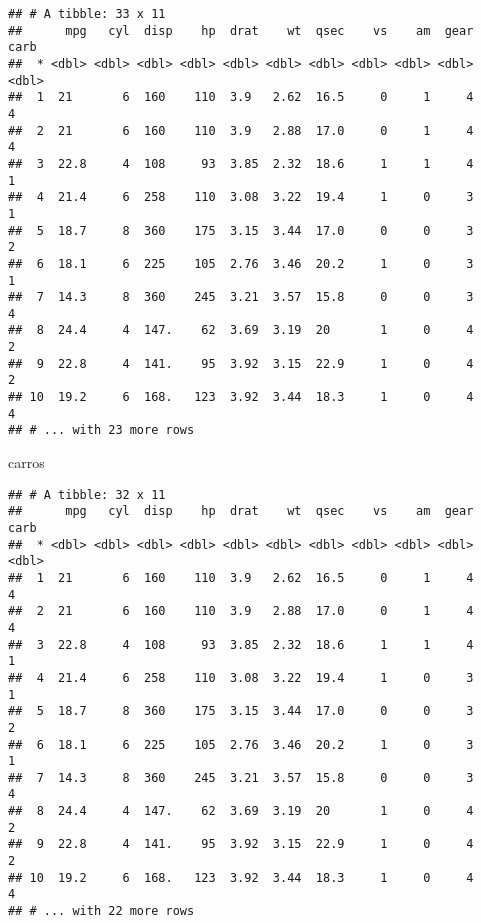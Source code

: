 \documentclass[]{book}
\newenvironment{Shaded}{\begin{snugshade}}{\end{snugshade}}
\newcommand{\DataTypeTok}[1]{\textcolor[rgb]{0.13,0.29,0.53}{#1}}
\newcommand{\DecValTok}[1]{\textcolor[rgb]{0.00,0.00,0.81}{#1}}
\newcommand{\KeywordTok}[1]{\textcolor[rgb]{0.13,0.29,0.53}{\textbf{#1}}}
\newcommand{\NormalTok}[1]{#1}
\newcommand{\OperatorTok}[1]{\textcolor[rgb]{0.81,0.36,0.00}{\textbf{#1}}}
\newcommand{\StringTok}[1]{\textcolor[rgb]{0.31,0.60,0.02}{#1}}
\begin{document}
\begin{verbatim}
## # A tibble: 33 x 11
##      mpg   cyl  disp    hp  drat    wt  qsec    vs    am  gear  carb
##  * <dbl> <dbl> <dbl> <dbl> <dbl> <dbl> <dbl> <dbl> <dbl> <dbl> <dbl>
##  1  21       6  160    110  3.9   2.62  16.5     0     1     4     4
##  2  21       6  160    110  3.9   2.88  17.0     0     1     4     4
##  3  22.8     4  108     93  3.85  2.32  18.6     1     1     4     1
##  4  21.4     6  258    110  3.08  3.22  19.4     1     0     3     1
##  5  18.7     8  360    175  3.15  3.44  17.0     0     0     3     2
##  6  18.1     6  225    105  2.76  3.46  20.2     1     0     3     1
##  7  14.3     8  360    245  3.21  3.57  15.8     0     0     3     4
##  8  24.4     4  147.    62  3.69  3.19  20       1     0     4     2
##  9  22.8     4  141.    95  3.92  3.15  22.9     1     0     4     2
## 10  19.2     6  168.   123  3.92  3.44  18.3     1     0     4     4
## # ... with 23 more rows
\end{verbatim}

\begin{Shaded}
\begin{Highlighting}[]
\NormalTok{carros}
\end{Highlighting}
\end{Shaded}

\begin{verbatim}
## # A tibble: 32 x 11
##      mpg   cyl  disp    hp  drat    wt  qsec    vs    am  gear  carb
##  * <dbl> <dbl> <dbl> <dbl> <dbl> <dbl> <dbl> <dbl> <dbl> <dbl> <dbl>
##  1  21       6  160    110  3.9   2.62  16.5     0     1     4     4
##  2  21       6  160    110  3.9   2.88  17.0     0     1     4     4
##  3  22.8     4  108     93  3.85  2.32  18.6     1     1     4     1
##  4  21.4     6  258    110  3.08  3.22  19.4     1     0     3     1
##  5  18.7     8  360    175  3.15  3.44  17.0     0     0     3     2
##  6  18.1     6  225    105  2.76  3.46  20.2     1     0     3     1
##  7  14.3     8  360    245  3.21  3.57  15.8     0     0     3     4
##  8  24.4     4  147.    62  3.69  3.19  20       1     0     4     2
##  9  22.8     4  141.    95  3.92  3.15  22.9     1     0     4     2
## 10  19.2     6  168.   123  3.92  3.44  18.3     1     0     4     4
## # ... with 22 more rows
\end{verbatim}

\begin{Shaded}
\end{Shaded}
\end{document}
